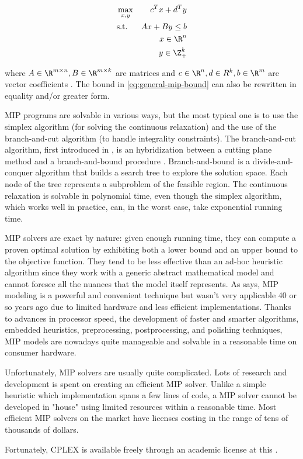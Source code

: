 \begin{align}
	 & \max_{x, y} & c^T x + d^T y                                 \\
	 & \text{s.t.} & A x + B y \le b  \label{eq:general-mip-bound} \\
	 &             & x \in \R^n                                    \\
	 &             & y \in \Z_{+}^k
\end{align}

where $A \in \R^{m \times n}, B \in \R^{m \times k}$ are matrices and
$c \in \R^n, d \in R^k, b \in \R^m$ are vector coefficients \parencite{wolsey1999integer}.
The bound in \cref{eq:general-mip-bound} can also be rewritten in equality and/or greater form.

MIP programs are solvable in various ways, but the most typical one is to use the simplex algorithm (for solving the continuous relaxation) and the use of the branch-and-cut algorithm (to handle integrality constraints).
The branch-and-cut algorithm, first introduced in \textcite{padberg1991}, is an hybridization between a cutting plane method and a branch-and-bound procedure \parencite{land2010}.
Branch-and-bound is a divide-and-conquer algorithm that builds a search tree to explore the solution space. Each node of the tree represents a subproblem of the feasible region.
The continuous relaxation is solvable in polynomial time, even though the simplex algorithm, which works well in practice, can, in the worst case, take exponential running time.

MIP solvers are exact by nature: given enough running time, they can compute a proven optimal solution by exhibiting both a lower bound and an upper bound to the objective function.
They tend to be less effective than an ad-hoc heuristic algorithm since they work with a generic abstract mathematical model and cannot foresee all the nuances that the model itself represents.
As \textcite{bixby1999} says, MIP modeling is a powerful and convenient technique but wasn't very applicable 40 or so years ago due to limited hardware and less efficient implementations.
Thanks to advances in processor speed, the development of faster and smarter algorithms, embedded heuristics, preprocessing, postprocessing, and polishing techniques, MIP models are nowadays quite manageable and solvable in a reasonable time on consumer hardware.

Unfortunately, MIP solvers are usually quite complicated.
Lots of research and development is spent on creating an efficient MIP solver.
Unlike a simple heuristic which implementation spans a few lines of code, a MIP solver cannot be developed in "house" using limited resources within a reasonable time.
Most efficient MIP solvers on the market have licenses costing in the range of tens of thousands of dollars.

Fortunately, CPLEX is available freely through an academic license at this .
